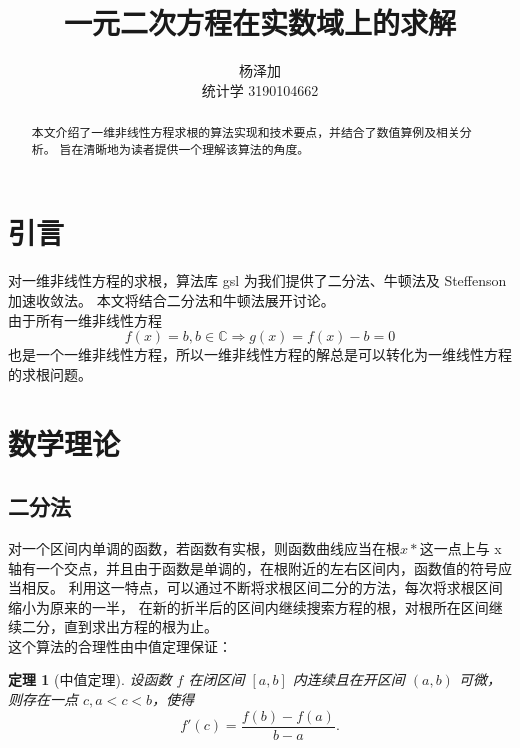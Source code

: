 \documentclass{ctexart}
\title{一元二次方程在实数域上的求解}
\author{杨泽加 \\ 统计学 3190104662}
\begin{document}
    \maketitle

    \begin{abstract}
        本文介绍了一维非线性方程求根的算法实现和技术要点，并结合了数值算例及相关分析。
        旨在清晰地为读者提供一个理解该算法的角度。
    \end{abstract}


    \section{引言}\label{S1}
    对一维非线性方程的求根，算法库 gsl 为我们提供了二分法、牛顿法及 Steffenson 加速收敛法。
    本文将结合二分法和牛顿法展开讨论。 \\
    由于所有一维非线性方程    \\
    \begin{equation}
        \label{E1}
        f(x) = b, b \in \mathbb{C} \Rightarrow g(x) = f(x) - b = 0
    \end{equation}
    也是一个一维非线性方程，所以一维非线性方程的解总是可以转化为一维线性方程的求根问题。


    \section{数学理论}\label{S2}

    \subsection{二分法}\label{S2.1}
    对一个区间内单调的函数，若函数有实根，则函数曲线应当在根$x*$这一点上与
    x轴有一个交点，并且由于函数是单调的，在根附近的左右区间内，函数值的符号应当相反。
    利用这一特点，可以通过不断将求根区间二分的方法，每次将求根区间缩小为原来的一半，
    在新的折半后的区间内继续搜索方程的根，对根所在区间继续二分，直到求出方程的根为止。 \\
    这个算法的合理性由中值定理保证：\\
    \newtheorem{theorem}{定理}
    \begin{theorem}[中值定理]
        \label{T1}
        设函数 $f$ 在闭区间 $[a,b]$ 内连续且在开区间 $(a,b)$ 可微，则存在一点
        $c, a < c < b$，使得
        \begin{equation}
            \label{E2}
            f'(c) = \frac{f(b) - f(a)}{b - a}.
        \end{equation}
    \end{theorem}
\end{document}
